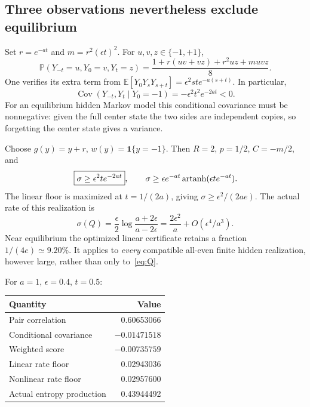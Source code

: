 \documentclass[11pt,a4paper]{article}
\newcommand{\E}{\mathbb E}\newcommand{\Prb}{\mathbb P}
\newcommand{\one}{\mathbf 1}\newcommand{\KL}{D_{\mathrm{KL}}}
\begin{document}
\subsection{Three observations nevertheless exclude equilibrium}
Set $r=e^{-at}$ and $m=r^2(\epsilon t)^2$. For $u,v,z\in\{-1,+1\}$,
\begin{equation}\label{eq:triple}
\Prb(Y_{-t}=u,Y_0=v,Y_t=z)
=\frac{1+r(uv+vz)+r^2uz+muvz}{8}.
\end{equation}
One verifies its extra term from $\E[Y_0Y_sY_{s+t}]=\epsilon^2st e^{-a(s+t)}$. In particular,
\begin{equation}\label{eq:cov}
\operatorname{Cov}(Y_{-t},Y_t\mid Y_0=-1)=-\epsilon^2t^2e^{-2at}<0.
\end{equation}
For an equilibrium hidden Markov model this conditional covariance must be nonnegative: given the full center state the two sides are independent copies, so forgetting the center state gives a variance.

Choose $g(y)=y+r$, $w(y)=\one\{y=-1\}$. Then $R=2$, $p=1/2$, $C=-m/2$, and
\begin{equation}\label{eq:familybound}
\boxed{\displaystyle\sigma\geq\epsilon^2t e^{-2at}},\qquad
\sigma\geq\epsilon e^{-at}\operatorname{artanh}(\epsilon t e^{-at}).
\end{equation}
The linear floor is maximized at $t=1/(2a)$, giving $\sigma\geq\epsilon^2/(2ae)$. The actual rate of this realization is
\begin{equation}\label{eq:actual}
\sigma(Q)=\frac\epsilon2\log\frac{a+2\epsilon}{a-2\epsilon}
=\frac{2\epsilon^2}{a}+O(\epsilon^4/a^3).
\end{equation}
Near equilibrium the optimized linear certificate retains a fraction $1/(4e)\simeq9.20\%$. It applies to \emph{every} compatible all-even finite hidden realization, however large, rather than only to~\eqref{eq:Q}.

For $a=1$, $\epsilon=0.4$, $t=0.5$:
\begin{center}\begin{tabular}{lr}\toprule
Quantity&Value\\\midrule
Pair correlation&0.60653066\\
Conditional covariance&$-0.01471518$\\
Weighted score&$-0.00735759$\\
Linear rate floor&0.02943036\\
Nonlinear rate floor&0.02957600\\
Actual entropy production&0.43944492\\\bottomrule
\end{tabular}\end{center}
\end{document}
